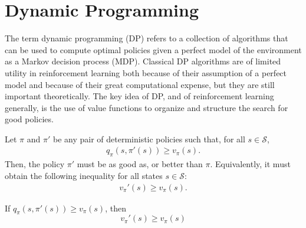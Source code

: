 \chapter{Dynamic Programming}
The term dynamic programming (DP) refers to a collection of algorithms that can be used to compute optimal policies given a perfect model of the environment as a Markov decision process (MDP). Classical DP algorithms are of limited utility in reinforcement learning both because of their assumption of a perfect model and because of their great computational expense, but they are still important theoretically. The key idea of DP, and of reinforcement learning generally, is the use of value functions to organize and structure the search for good policies.


Let $\pi$ and $\pi'$ be any pair of deterministic policies such that, for all $s\in \mathcal{S}$, 
\begin{align*}
	q_\pi(s, \pi'(s))\geq v_\pi(s).	
\end{align*}
Then, the policy $\pi'$ must be as good as, or better than $\pi$. Equivalently, it must obtain the following inequality for all states $s\in \mathcal{S}$:
\begin{align*}
	v_\pi'(s)\geq v_\pi(s).	
\end{align*}

\begin{theorem}
	If $q_\pi(s, \pi'(s))\geq v_\pi(s)$, then 
	$$v_\pi'(s)\geq v_\pi(s)$$
	\label{thrm:policy_improvement}
\end{theorem}



